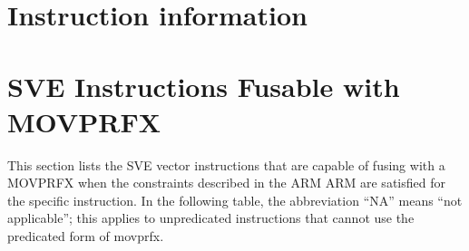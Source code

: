 \documentclass{article}
\begin{document}
\newpage
\section{Instruction information}

\newpage
\section{SVE Instructions Fusable with MOVPRFX}
\label{sec-movprfx-table}
This section lists the SVE vector instructions that are capable of
fusing with a MOVPRFX when the constraints described in the ARM ARM
are satisfied for the specific instruction. In the following table,
the abbreviation ``NA'' means ``not applicable''; this applies to
unpredicated instructions that cannot use the predicated form of
movprfx.

\end{document}
